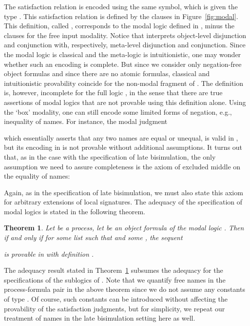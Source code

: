 \documentclass{acmtrans2m}
\newtheorem{theorem}{Theorem}
\begin{document}
The satisfaction relation  is encoded using the same symbol, 
which is given the type . This satisfaction
relation is defined by the clauses in Figure~\ref{fig:modal}.
This definition, called , 
corresponds to the modal logic  defined in \cite{milner93tcs}, minus
the clauses for the free input modality.  
Notice that  interprets object-level disjunction and conjunction
with, respectively, meta-level disjunction and conjunction. Since the modal logic 
is classical and the meta-logic  is intuitionistic, 
one may wonder whether such an encoding is complete. But since 
we consider only negation-free object formulas and since 
there are no atomic formulas, classical and intuitionistic provability
coincide for the non-modal fragment of .
The definition  is, however, incomplete for the full logic , 
in the sense that there are true assertions of modal logics that are not provable 
using this definition alone. Using the `box' modality, one can still encode 
some limited forms of negation, e.g., inequality of names. For instance, the modal judgment 

which essentially asserts that any two names are equal or unequal, is valid in , 
but its encoding in  is not provable without additional assumptions. 
It turns out that, as in the case with the specification of late bisimulation,
the only assumption we need to assure completeness is the 
axiom of excluded middle on the equality of names: 

Again, as in the specification of late bisimulation, we must also
state this axiom for arbitrary extensions of local signatures. 
The adequacy of the specification of modal logics is 
stated in the following theorem.

\begin{theorem}
\label{thm:modal adequacy}
Let  be a process, let  be an object formula of the modal logic . 
Then  if and only if for some
list  such that 
and some  ,  
the sequent 

is provable in  with definition .
\end{theorem}

The adequacy result stated in Theorem~\ref{thm:modal adequacy}
subsumes the adequacy for the specifications of the sublogics of .
Note that we quantify free names in the process-formula pair
in the above theorem since we do not assume any constants
of type . Of course, such constants can be introduced
without affecting the provability of the satisfaction 
judgments, but for simplicity, we repeat our treatment of names in the
late bisimulation setting here as well.
\end{document}
